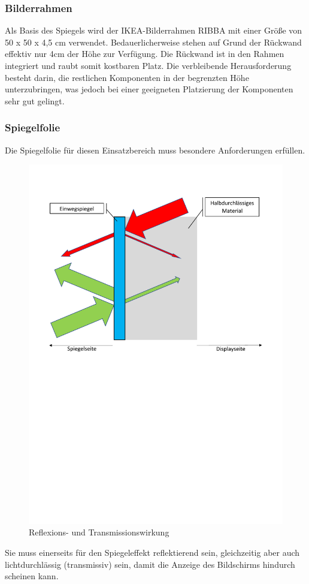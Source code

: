 \subsubsection*{Bilderrahmen}
Als Basis des Spiegels wird der IKEA-Bilderrahmen RIBBA mit einer Größe von 50 x 50 x 4,5 cm verwendet. Bedauerlicherweise stehen auf Grund der Rückwand effektiv nur 4cm der Höhe zur Verfügung. Die Rückwand ist in den Rahmen integriert und raubt somit kostbaren Platz. Die verbleibende Herausforderung besteht darin, die restlichen Komponenten in der begrenzten Höhe unterzubringen, was jedoch bei einer geeigneten Platzierung der Komponenten sehr gut gelingt. 

\subsubsection*{Spiegelfolie}
Die Spiegelfolie für diesen Einsatzbereich muss besondere Anforderungen erfüllen. 
\begin{figure}
	\includegraphics[trim=10mm 140mm 30mm 80mm, scale=0.35]{bilder/Einwegspiegel.pdf}
	\caption{Reflexions- und Transmissionswirkung}
	\label{fig:Spiegelfolie}
\end{figure}
Sie muss einerseits für den Spiegeleffekt reflektierend sein, gleichzeitig aber auch lichtdurchlässig (transmissiv) sein, damit die Anzeige des Bildschirms hindurch scheinen kann. 

